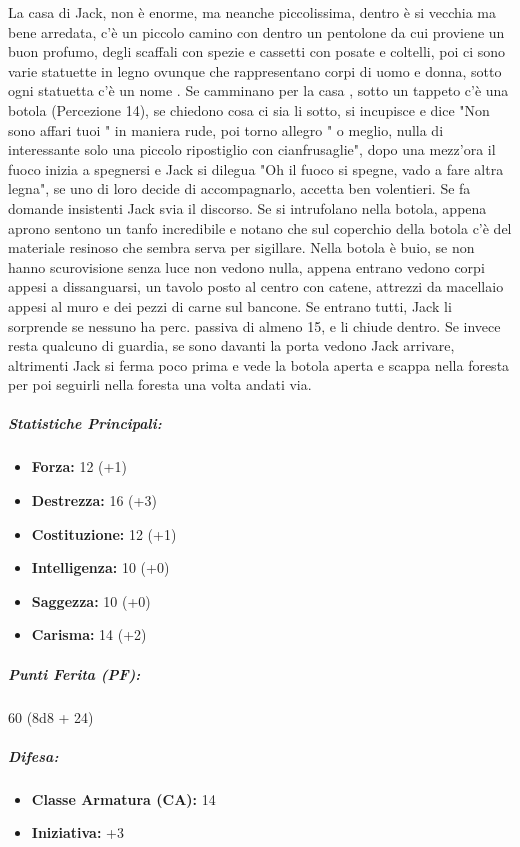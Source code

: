 \documentclass{article}
\begin{document}
La casa di Jack, non è enorme, ma neanche piccolissima, dentro è si vecchia ma bene arredata, c'è un piccolo camino con dentro un pentolone da cui proviene un buon profumo, degli scaffali con spezie e cassetti con posate e coltelli, poi ci sono varie statuette in legno ovunque che rappresentano corpi di uomo e donna, sotto ogni statuetta c'è un nome . Se camminano per la casa , sotto un tappeto c'è una botola (Percezione 14), se chiedono cosa ci sia li sotto, si incupisce e dice "Non sono affari tuoi " in maniera rude, poi torno allegro " o meglio, nulla di interessante solo una piccolo ripostiglio con cianfrusaglie", dopo una mezz'ora il fuoco inizia a spegnersi e Jack si dilegua "Oh il fuoco si spegne, vado a fare altra legna", se uno di loro decide di accompagnarlo, accetta ben volentieri. Se fa domande insistenti Jack svia il discorso. Se si intrufolano nella botola, appena aprono sentono un tanfo incredibile e notano che sul coperchio della botola c'è del materiale resinoso che sembra serva per sigillare. Nella botola è buio, se non hanno scurovisione senza luce non vedono nulla, appena entrano vedono corpi appesi a dissanguarsi, un tavolo posto al centro con catene, attrezzi da macellaio appesi al muro e dei pezzi di carne sul bancone. Se entrano tutti, Jack li sorprende se nessuno ha perc. passiva di almeno 15, e li chiude dentro. Se invece resta qualcuno di guardia, se sono davanti la porta vedono Jack arrivare, altrimenti Jack si ferma poco prima e vede la botola aperta e scappa nella foresta per poi seguirli nella foresta una volta andati via.   
   

\subparagraph*{Statistiche Principali:}
\begin{itemize}
  \item \textbf{Forza:} 12 (+1)
  \item \textbf{Destrezza:} 16 (+3)
  \item \textbf{Costituzione:} 12 (+1)
  \item \textbf{Intelligenza:} 10 (+0)
  \item \textbf{Saggezza:} 10 (+0)
  \item \textbf{Carisma:} 14 (+2)
\end{itemize}

\subparagraph*{Punti Ferita (PF):}
60 (8d8 + 24)

\subparagraph*{Difesa:}
\begin{itemize}
  \item \textbf{Classe Armatura (CA):} 14
  \item \textbf{Iniziativa:} +3
\end{itemize}
\end{document}
